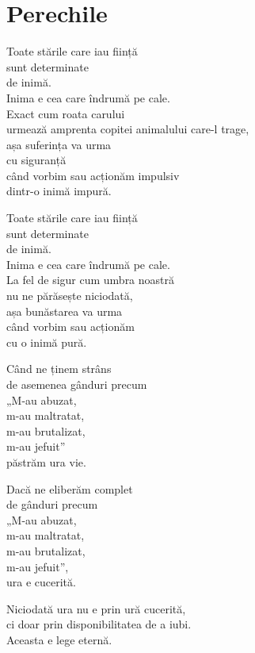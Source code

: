 
\chapter{Perechile}

Toate stările care iau ființă\\
sunt determinate\\
de inimă.\\
Inima e cea care îndrumă pe cale.\\
Exact cum roata carului\\
urmează amprenta copitei animalului care-l trage,\\
așa suferința va urma\\
cu siguranță\\
când vorbim sau acționăm impulsiv\\
dintr-o inimă impură.


Toate stările care iau ființă\\
sunt determinate\\
de inimă.\\
Inima e cea care îndrumă pe cale.\\
La fel de sigur cum umbra noastră\\
nu ne părăsește niciodată,\\
așa bunăstarea va urma\\
când vorbim sau acționăm\\
cu o inimă pură.


Când ne ținem strâns\\
de asemenea gânduri precum\\
„M-au abuzat,\\
m-au maltratat,\\
m-au brutalizat,\\
m-au jefuit”\\
păstrăm ura vie.


Dacă ne eliberăm complet\\
de gânduri precum\\
„M-au abuzat,\\
m-au maltratat,\\
m-au brutalizat,\\
m-au jefuit”,\\
ura e cucerită.


Niciodată ura nu e prin ură cucerită,\\
ci doar prin disponibilitatea de a iubi.\\
Aceasta e lege eternă.

